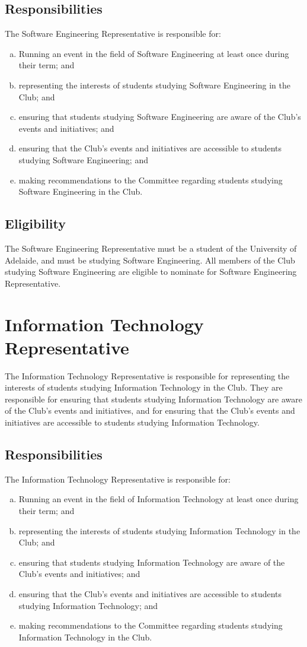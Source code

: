 \documentclass[11pt]{report}
\begin{document}
\subsection{Responsibilities}
The Software Engineering Representative is responsible for:
\begin{enumerate}[(a)]
    \item Running an event in the field of Software Engineering at least once during their term; and
    \item representing the interests of students studying Software Engineering in the Club; and
    \item ensuring that students studying Software Engineering are aware of the Club's events and initiatives; and
    \item ensuring that the Club's events and initiatives are accessible to students studying Software Engineering; and
    \item making recommendations to the Committee regarding students studying Software Engineering in the Club.
\end{enumerate}
\subsection{Eligibility}
The Software Engineering Representative must be a student of the University of Adelaide, and must be studying Software Engineering. All members of the Club studying Software Engineering are eligible to nominate for Software Engineering Representative.

\section{Information Technology Representative}
The Information Technology Representative is responsible for representing the interests of students studying Information Technology in the Club. They are responsible for ensuring that students studying Information Technology are aware of the Club's events and initiatives, and for ensuring that the Club's events and initiatives are accessible to students studying Information Technology.
\subsection{Responsibilities}
The Information Technology Representative is responsible for:
\begin{enumerate}[(a)]
    \item Running an event in the field of Information Technology at least once during their term; and
    \item representing the interests of students studying Information Technology in the Club; and
    \item ensuring that students studying Information Technology are aware of the Club's events and initiatives; and
    \item ensuring that the Club's events and initiatives are accessible to students studying Information Technology; and
    \item making recommendations to the Committee regarding students studying Information Technology in the Club.
\end{enumerate}
\end{document}

